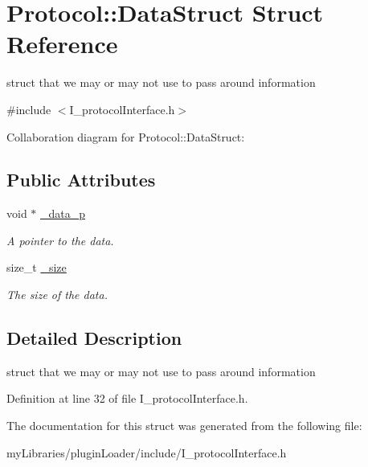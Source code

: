 \hypertarget{structProtocol_1_1DataStruct}{}\section{Protocol\+::Data\+Struct Struct Reference}
\label{structProtocol_1_1DataStruct}


struct that we may or may not use to pass around information  




{\ttfamily \#include $<$I\+\_\+protocol\+Interface.\+h$>$}



Collaboration diagram for Protocol\+::Data\+Struct\+:
\subsection*{Public Attributes}
\begin{DoxyCompactItemize}
\item 
\mbox{\label{structProtocol_1_1DataStruct_af99bd4f723a2496be8b2737d71dc96bc}} 
void $\ast$ \mbox{\hyperlink{structProtocol_1_1DataStruct_af99bd4f723a2496be8b2737d71dc96bc}{\+\_\+data\+\_\+p}}
\begin{DoxyCompactList}\small\item\em A pointer to the data. \end{DoxyCompactList}\item 
\mbox{\label{structProtocol_1_1DataStruct_a4a110cc48a08bed9c4acd8488bea1c78}} 
size\+\_\+t \mbox{\hyperlink{structProtocol_1_1DataStruct_a4a110cc48a08bed9c4acd8488bea1c78}{\+\_\+size}}
\begin{DoxyCompactList}\small\item\em The size of the data. \end{DoxyCompactList}\end{DoxyCompactItemize}


\subsection{Detailed Description}
struct that we may or may not use to pass around information 

Definition at line 32 of file I\+\_\+protocol\+Interface.\+h.



The documentation for this struct was generated from the following file\+:\begin{DoxyCompactItemize}
\item 
my\+Libraries/plugin\+Loader/include/I\+\_\+protocol\+Interface.\+h\end{DoxyCompactItemize}
